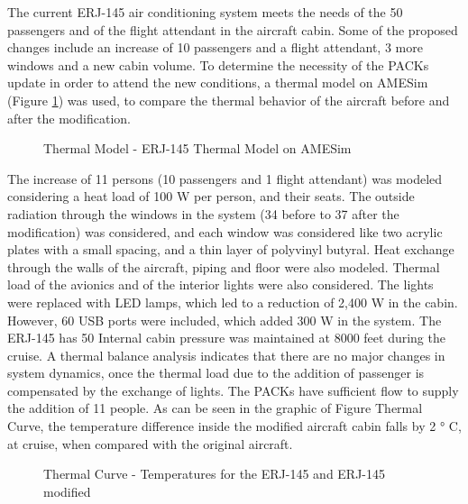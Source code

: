 ﻿The current ERJ-145 air conditioning system meets the needs of the 50 passengers and of the flight attendant in the aircraft cabin.
Some of the proposed changes include an increase of 10 passengers and a flight attendant, 3 more windows and a new cabin volume.
To determine the necessity of the PACKs update in order to attend the new conditions, a thermal model on AMESim (Figure \ref{fig:thermalmodel}) was used, to compare the thermal behavior of the aircraft before and after the modification.

 \begin{figure}[H] %
\caption{Thermal Model - ERJ-145 Thermal Model on AMESim}
\label{fig:thermalmodel}
\end{figure}

The increase of 11 persons (10 passengers and 1 flight attendant) was modeled considering a heat load of 100 W per person, and their seats.
The outside radiation through the windows in the system (34 before to 37 after the modification) was considered, and each window was considered like two acrylic plates with a small spacing, and a thin layer of polyvinyl butyral.
Heat exchange through the walls of the aircraft, piping and floor were also modeled.
Thermal load of the avionics and of the interior lights were also considered. The lights were replaced with LED lamps, which led to a reduction of 2,400 W in the cabin.
However, 60 USB ports were included, which added 300 W in the system.
The ERJ-145 has 50%
Internal cabin pressure was maintained at 8000 feet during the cruise.
A thermal balance analysis indicates that there are no major changes in system dynamics, once the thermal load due to the addition of passenger is compensated by the exchange of lights. The PACKs have sufficient flow to supply the addition of 11 people.
As can be seen in the graphic of Figure Thermal Curve, the temperature difference inside the  modified aircraft cabin falls by 2 ° C, at cruise, when compared with the original aircraft.

 \begin{figure}[H] %
\caption{Thermal Curve - Temperatures for the ERJ-145 and ERJ-145 modified}
\label{fig:thermalcurve}
\end{figure}


